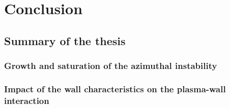 \clearpage
\ifodd\value{page}\else
  \thispagestyle{empty}
\fi
\chapter{Conclusion}
\label{ch-conclusion}


\section{Summary of the thesis}

  \lipsum[1-2]

  \subsection{Growth and saturation of the azimuthal instability}

    \lipsum[1-2]

  \subsection{Impact of the wall characteristics on the plasma-wall interaction }
  \lipsum[1-2]
